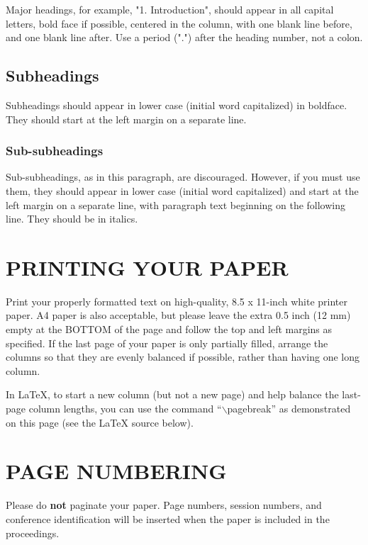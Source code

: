 \documentclass{article}
\begin{document}
Major headings, for example, "1. Introduction", should appear in all capital
letters, bold face if possible, centered in the column, with one blank line
before, and one blank line after. Use a period (".") after the heading number,
not a colon.

\subsection{Subheadings}
\label{ssec:subhead}

Subheadings should appear in lower case (initial word capitalized) in
boldface.  They should start at the left margin on a separate line.
 
\subsubsection{Sub-subheadings}
\label{sssec:subsubhead}

Sub-subheadings, as in this paragraph, are discouraged. However, if you
must use them, they should appear in lower case (initial word
capitalized) and start at the left margin on a separate line, with paragraph
text beginning on the following line.  They should be in italics.

\section{PRINTING YOUR PAPER}
\label{sec:print}

Print your properly formatted text on high-quality, 8.5 x 11-inch white printer
paper. A4 paper is also acceptable, but please leave the extra 0.5 inch (12 mm)
empty at the BOTTOM of the page and follow the top and left margins as
specified.  If the last page of your paper is only partially filled, arrange
the columns so that they are evenly balanced if possible, rather than having
one long column.

In LaTeX, to start a new column (but not a new page) and help balance the
last-page column lengths, you can use the command ``$\backslash$pagebreak'' as
demonstrated on this page (see the LaTeX source below).

\section{PAGE NUMBERING}
\label{sec:page}

Please do {\bf not} paginate your paper.  Page numbers, session numbers, and
conference identification will be inserted when the paper is included in the
proceedings.
\end{document}
